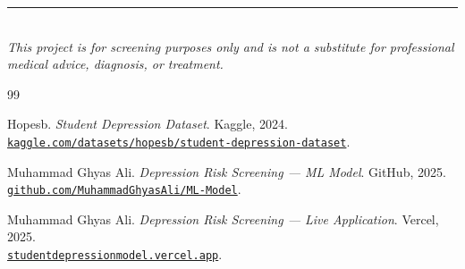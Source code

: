 \documentclass[11pt,a4paper]{article}
\begin{document}
\vspace{1.5em}
{\centering
\rule{0.35\textwidth}{0.4pt}\\[0.8em]
{\footnotesize\color{slate}
\textit{This project is for screening purposes only and is not a substitute for professional medical advice, diagnosis, or treatment.}}\par}

\clearpage
\begin{thebibliography}{99}

Hopesb. \textit{Student Depression Dataset}. Kaggle, 2024. \\
\href{https://www.kaggle.com/datasets/hopesb/student-depression-dataset}{\texttt{kaggle.com/datasets/hopesb/student-depression-dataset}}.

Muhammad Ghyas Ali. \textit{Depression Risk Screening --- ML Model}. GitHub, 2025. \\
\href{https://github.com/MuhammadGhyasAli/ML-Model}{\texttt{github.com/MuhammadGhyasAli/ML-Model}}.

Muhammad Ghyas Ali. \textit{Depression Risk Screening --- Live Application}. Vercel, 2025. \\
\href{https://studentdepressionmodel.vercel.app}{\texttt{studentdepressionmodel.vercel.app}}.

\end{thebibliography}
\end{document}
